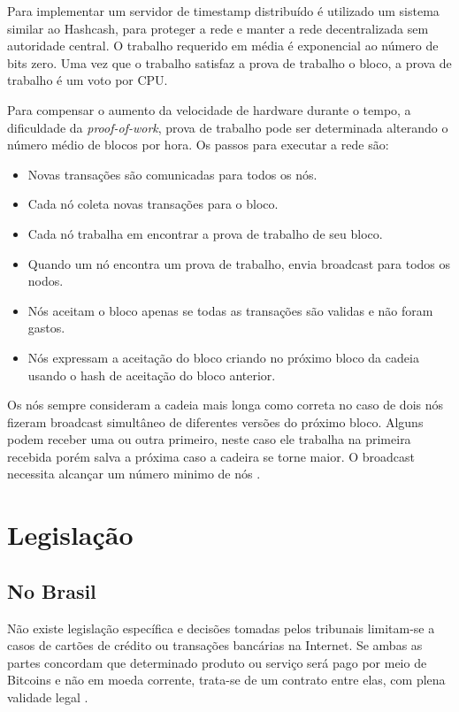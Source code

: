 \documentclass[a4paper,11pt]{article}
\theoremstyle{mytheor}
\begin{document}
Para implementar um servidor de timestamp distribuído é utilizado um sistema similar ao Hashcash, para proteger a rede e manter a rede decentralizada sem autoridade central. O trabalho requerido em média é exponencial ao número de bits zero. Uma vez que o trabalho satisfaz a prova de trabalho o bloco, a prova de trabalho é um voto por CPU.

Para compensar o aumento da velocidade de hardware durante o tempo, a dificuldade da \textit{proof-of-work}, prova de trabalho pode ser determinada alterando o número médio de blocos por hora. Os passos para executar a rede são:
\begin{itemize}
    \item Novas transações são comunicadas para todos os nós.
    \item Cada nó coleta novas transações para o bloco.
    \item Cada nó trabalha em encontrar a prova de trabalho de seu bloco.
    \item Quando um nó encontra um prova de trabalho, envia broadcast para todos os nodos.
    \item Nós aceitam o bloco apenas se todas as transações são validas e não foram gastos.
    \item Nós expressam a aceitação do bloco criando no próximo bloco da cadeia usando o hash de aceitação do bloco anterior.
\end{itemize}

Os nós sempre consideram a cadeia mais longa como correta no caso de dois nós fizeram broadcast simultâneo de diferentes versões do próximo bloco. Alguns podem receber uma ou outra primeiro, neste caso ele trabalha na primeira recebida porém salva a próxima caso a cadeira se torne maior. O broadcast necessita alcançar um número minimo de nós \cite{nakamoto2008bitcoin}.

\section*{Legislação}
\subsection*{No Brasil}

Não existe legislação específica e decisões tomadas pelos tribunais limitam-se a casos de cartões de crédito ou transações bancárias na Internet. Se ambas as partes concordam que determinado produto ou serviço será pago por meio de Bitcoins e não em moeda corrente, trata-se de um contrato entre elas, com plena validade legal \cite{pascale}.
\end{document}
